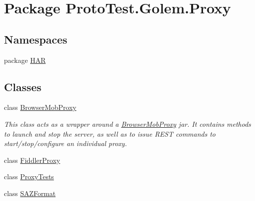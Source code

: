 \hypertarget{namespace_proto_test_1_1_golem_1_1_proxy}{\section{Package Proto\-Test.\-Golem.\-Proxy}
\label{namespace_proto_test_1_1_golem_1_1_proxy}
}
\subsection*{Namespaces}
\begin{DoxyCompactItemize}
\item 
package \hyperlink{namespace_proto_test_1_1_golem_1_1_proxy_1_1_h_a_r}{H\-A\-R}
\end{DoxyCompactItemize}
\subsection*{Classes}
\begin{DoxyCompactItemize}
\item 
class \hyperlink{class_proto_test_1_1_golem_1_1_proxy_1_1_browser_mob_proxy}{Browser\-Mob\-Proxy}
\begin{DoxyCompactList}\small\item\em This class acts as a wrapper around a \hyperlink{class_proto_test_1_1_golem_1_1_proxy_1_1_browser_mob_proxy}{Browser\-Mob\-Proxy} jar. It contains methods to launch and stop the server, as well as to issue R\-E\-S\-T commands to start/stop/configure an individual proxy. \end{DoxyCompactList}\item 
class \hyperlink{class_proto_test_1_1_golem_1_1_proxy_1_1_fiddler_proxy}{Fiddler\-Proxy}
\item 
class \hyperlink{class_proto_test_1_1_golem_1_1_proxy_1_1_proxy_tests}{Proxy\-Tests}
\item 
class \hyperlink{class_proto_test_1_1_golem_1_1_proxy_1_1_s_a_z_format}{S\-A\-Z\-Format}
\end{DoxyCompactItemize}
